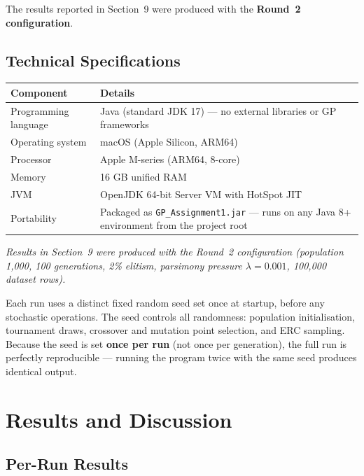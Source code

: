 \documentclass[12pt,a4paper]{article}
\begin{document}
The results reported in Section~9 were produced with the \textbf{Round~2 configuration}.

\subsection{Technical Specifications}

\begin{center}
\begin{tabular}{L{4cm} L{9cm}}
\toprule
\textbf{Component} & \textbf{Details} \\
\midrule
Programming language & Java (standard JDK 17) --- no external libraries or GP frameworks \\
Operating system     & macOS (Apple Silicon, ARM64) \\
Processor            & Apple M-series (ARM64, 8-core) \\
Memory               & 16 GB unified RAM \\
JVM                  & OpenJDK 64-bit Server VM with HotSpot JIT \\
Portability          & Packaged as \texttt{GP\_Assignment1.jar} --- runs on any Java 8+ environment from the project root \\
\bottomrule
\end{tabular}
\end{center}

\smallskip
\noindent\textit{Results in Section~9 were produced with the Round~2 configuration (population 1,000, 100 generations, 2\% elitism, parsimony pressure $\lambda = 0.001$, 100,000 dataset rows).}

Each run uses a distinct fixed random seed set once at startup, before any stochastic operations. The seed controls all randomness: population initialisation, tournament draws, crossover and mutation point selection, and ERC sampling. Because the seed is set \textbf{once per run} (not once per generation), the full run is perfectly reproducible --- running the program twice with the same seed produces identical output.

\section{Results and Discussion}

\subsection{Per-Run Results}
\end{document}
